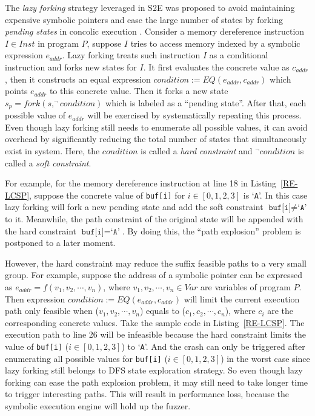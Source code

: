 The \textit{lazy forking} strategy leveraged in S2E was proposed to avoid 
maintaining expensive symbolic pointers and ease the large number 
of states by forking \textit{pending states} in concolic 
execution \cite{chipounov2011s2e}. 
Consider a memory dereference instruction $I\in Inst$ in program $P$, 
suppose $I$ tries to access memory indexed by a symbolic expression 
$e_{addr}$.
Lazy forking treats such instruction $I$ as a conditional instruction 
and forks new states for $I$. It first evaluates the concrete value 
as $c_{addr}$, then it constructs an equal
expression $condition:= EQ(e_{addr}, c_{addr})$ 
which points $e_{addr}$ to this concrete value. Then it forks a 
new state $s_p=fork(s, ^\neg condition)$ which is labeled as a 
``pending state''. After that, each possible value of $e_{addr}$ 
will be exercised by systematically repeating this process. Even 
though lazy forking still needs to enumerate all possible values, 
it can avoid overhead by significantly reducing the total number 
of states that simultaneously exist in system. Here, 
the $condition$ is called a \textit{hard constraint} and 
$^\neg condition$ is called a \textit{soft constraint}.

For example, for the memory dereference instruction at line 18 
in Listing~\ref{RE-LCSP}, suppose the concrete value of 
\texttt{buf[i]} for $i\in[0,1,2,3]$ is `\texttt{A}'. 
In this case lazy forking will fork a new pending state and 
add the soft constraint $\texttt{buf[i]}\neq\texttt{`A'}$ to 
it. Meanwhile, the path constraint of the original state will 
be appended with the hard constraint $\texttt{buf[i]}=\texttt{`A'}$.
By doing this, the ``path explosion'' problem is postponed to a later moment.

However, the hard constraint may reduce the suffix feasible paths 
to a very small group. For example, suppose the address of a symbolic 
pointer can be expressed as $e_{addr}=f(v_1, v_2,\cdots, v_n)$, 
where $v_1, v_2,\cdots, v_n\in Var$ are variables of program $P$. 
Then expression $condition:= EQ(e_{addr}, c_{addr})$ will limit 
the current execution path only feasible when ($v_1, v_2,\cdots, v_n$) 
equals to ($c_1, c_2,\cdots, c_n$), where $c_i$ are the 
corresponding concrete values. 
Take the sample code in Listing~\ref{RE-LCSP}. The execution path 
to line 26 will be infeasible because the hard constraint limits 
the value of \texttt{buf[i]} ($i\in[0,1,2,3]$) to `\texttt{A}'. 
And the crash can only be triggered after enumerating all possible 
values for \texttt{buf[i]} ($i\in[0,1,2,3]$) in the worst case since
lazy forking still belongs to DFS state exploration strategy.
So even though lazy forking can ease the path explosion problem, 
it may still need to take longer time to trigger interesting paths. 
This will result in performance loss, because the symbolic 
execution engine will hold up the fuzzer. 

